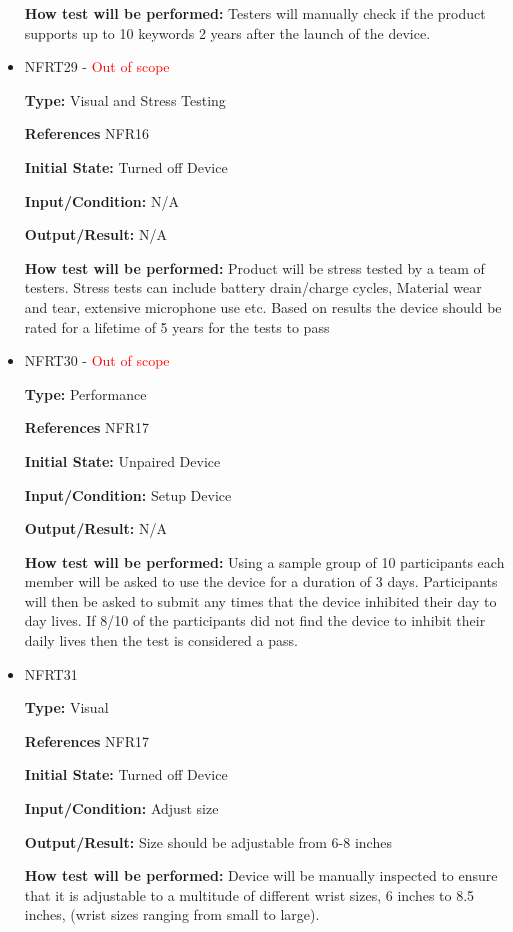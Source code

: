 \documentclass[12pt, titlepage]{article}
\begin{document}
\begin{itemize}
\textbf{How test will be performed:} Testers will manually check if the product supports up to 10 keywords 2 years after the launch of the device.

\item{NFRT29 - \textcolor{red}{Out of scope}}

\textbf{Type:} Visual and Stress Testing

\textbf{References} NFR16
					
\textbf{Initial State:} Turned off Device
					
\textbf{Input/Condition:} N/A
					
\textbf{Output/Result:} N/A
					
\textbf{How test will be performed:} Product will be stress tested by a team of testers. Stress tests can include battery drain/charge cycles, Material wear and tear, extensive microphone use etc. Based on results the device should be rated for a lifetime of 5 years for the tests to pass

\item{NFRT30 - \textcolor{red}{Out of scope}}

\textbf{Type:} Performance

\textbf{References} NFR17
					
\textbf{Initial State:} Unpaired Device
					
\textbf{Input/Condition:} Setup Device
					
\textbf{Output/Result:} N/A
					
\textbf{How test will be performed:} Using a sample group of 10 participants each member will be asked to use the device for a duration of 3 days. Participants will then be asked to submit any times that the device inhibited their day to day lives. If 8/10 of the participants did not find the device to inhibit their daily lives then the test is considered a pass.

\item{NFRT31}

\textbf{Type:} Visual

\textbf{References} NFR17
					
\textbf{Initial State:} Turned off Device
					
\textbf{Input/Condition:} Adjust size
					
\textbf{Output/Result:} Size should be adjustable from 6-8 inches
					
\textbf{How test will be performed:} Device will be manually inspected to ensure that it is adjustable to a multitude of different wrist sizes, 6 inches to 8.5 inches, (wrist sizes ranging from small to large). 


\end{itemize}
\end{document}
